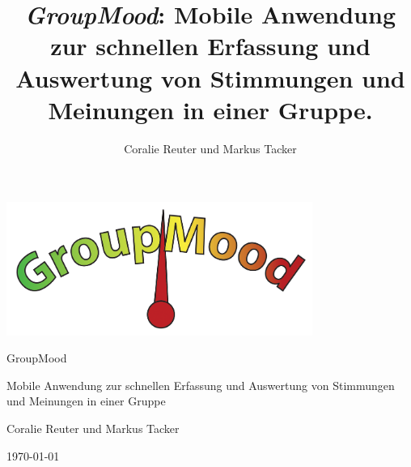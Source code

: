 \documentclass[10pt,a4paper]{article}
\begin{document}
\author{Coralie Reuter und Markus Tacker}
\title{\emph{GroupMood}: Mobile Anwendung zur schnellen Erfassung und Auswertung von Stimmungen und Meinungen in einer Gruppe.}
\begin{center}
\includegraphics[width=10cm]{media/GroupMood.png}

\begin{huge}GroupMood\end{huge}

\begin{large}Mobile Anwendung zur schnellen Erfassung und Auswertung von Stimmungen und Meinungen in einer Gruppe\end{large}

Coralie Reuter und Markus Tacker

\today

\end{center}

\bigskip 



\tableofcontents






\end{document}
